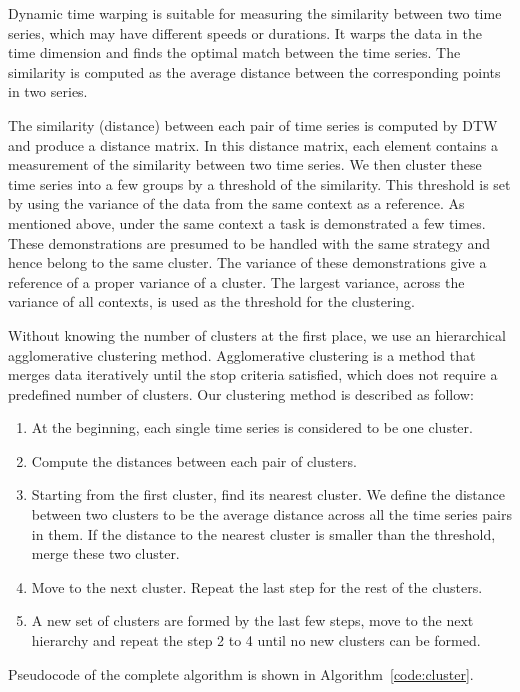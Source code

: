 Dynamic time warping is suitable for measuring the similarity between two time series, which may have different speeds or durations. It warps the data in the time dimension and finds the optimal match between the time series. The similarity is computed as the average distance between the corresponding points in two series.

The similarity (distance) between each pair of time series is computed by DTW and produce a distance matrix. In this distance matrix, each element contains a measurement of the similarity between two time series. We then cluster these time series into a few groups by a threshold of the similarity. This threshold is set by using the variance of the data from the same context as a reference. As mentioned above, under the same context a task is demonstrated a few times. These demonstrations are presumed to be handled with the same strategy and hence belong to the same cluster. The variance of these demonstrations give a reference of a proper variance of a cluster. The largest variance, across the variance of all contexts, is used as the threshold for the clustering.

Without knowing the number of clusters at the first place, we use an hierarchical agglomerative clustering method. Agglomerative clustering is a method that merges data iteratively until the stop criteria satisfied, which does not require a predefined number of clusters. Our clustering method is described as follow:

\begin{enumerate}
\item At the beginning, each single time series is considered to be one cluster.
\item Compute the distances between each pair of clusters.
\item Starting from the first cluster, find its nearest cluster. We define the distance between two clusters to be the average distance across all the time series pairs in them. If the distance to the nearest cluster is smaller than the threshold, merge these two cluster.
\item Move to the next cluster. Repeat the last step for the rest of the clusters.
\item A new set of clusters are formed by the last few steps, move to the next hierarchy and repeat the step 2 to 4 until no new clusters can be formed.
\end{enumerate}

Pseudocode of the complete algorithm is shown in Algorithm~\ref{code:cluster}.

